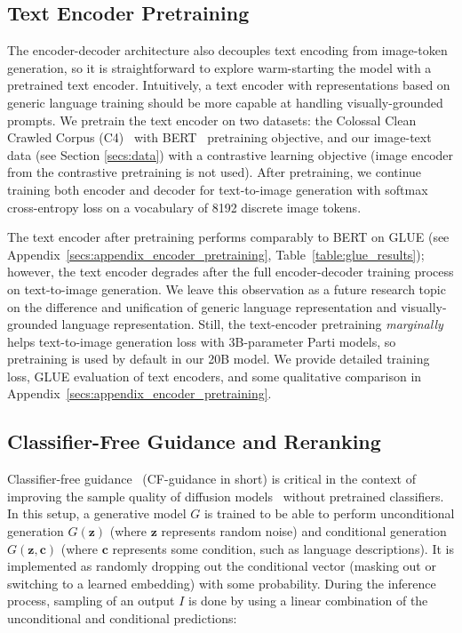 \subsection{Text Encoder Pretraining} The encoder-decoder architecture also decouples text encoding from image-token generation, so it is straightforward to explore warm-starting the model with a pretrained text encoder. Intuitively, a text encoder with representations based on generic language training should be more capable at handling visually-grounded prompts. We pretrain the text encoder on two datasets: the Colossal Clean Crawled Corpus (C4)~\cite{raffel2019exploring} with BERT~\cite{devlin2018bert} pretraining objective, and our image-text data (see Section \ref{secs:data}) with a contrastive learning objective (image encoder from the contrastive pretraining is not used). After pretraining, we continue training both encoder and decoder for text-to-image generation with softmax cross-entropy loss on a vocabulary of 8192 discrete image tokens.

The text encoder after pretraining performs comparably to BERT \cite{devlin2018bert} on GLUE (see Appendix~\ref{secs:appendix_encoder_pretraining}, Table~\ref{table:glue_results}); however, the text encoder degrades after the full encoder-decoder training process on text-to-image generation. We leave this observation as a future research topic on the difference and unification of generic language representation and visually-grounded language representation. Still, the text-encoder pretraining \textit{marginally} helps text-to-image generation loss with 3B-parameter Parti models, so pretraining is used by default in our 20B model. We provide detailed training loss, GLUE evaluation of text encoders, and some qualitative comparison in Appendix~\ref{secs:appendix_encoder_pretraining}.

\subsection{Classifier-Free Guidance and Reranking} \label{secs:sampling_cf_coca}
Classifier-free guidance~\cite{ho2021classifier} (CF-guidance in short) is critical in the context of improving the sample quality of diffusion models~\cite{nichol2021glide, ramesh2022hierarchical, imagen} without pretrained classifiers. In this setup, a generative model $G$ is trained to be able to perform unconditional generation $G(\mathbf {z})$ (where $\mathbf {z}$ represents random noise) and conditional generation $G(\mathbf {z}, \mathbf{c})$ (where $\mathbf{c}$ represents some condition, such as language descriptions). It is implemented as randomly dropping out the conditional vector (masking out or switching to a learned embedding) with some probability. During the inference process, sampling of an output $I$ is done by using a linear combination of the unconditional and conditional predictions:

